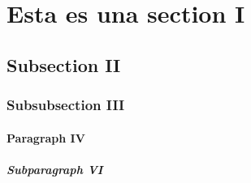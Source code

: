 \section{\large Esta es una section I}
\subsection{Subsection II} 
\subsubsection{Subsubsection III}
\paragraph{Paragraph IV}
\subparagraph{Subparagraph VI}